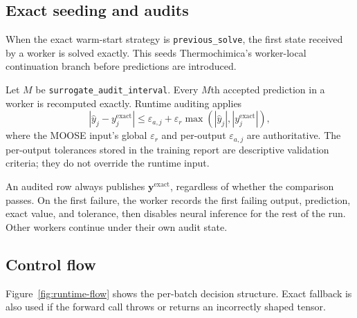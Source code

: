 \documentclass[11pt]{article}
\newcommand{\abs}[1]{\left\lvert #1\right\rvert}
\newcommand{\code}[1]{\texttt{#1}}
\begin{document}
\subsection{Exact seeding and audits}

When the exact warm-start strategy is \code{previous\_solve}, the first state received by a worker
is solved exactly.  This seeds Thermochimica's worker-local continuation branch before predictions
are introduced.

Let \(M\) be \code{surrogate\_audit\_interval}.  Every \(M\)th accepted prediction in a worker is
recomputed exactly.  Runtime auditing applies
\begin{equation}
  \abs{\widehat y_j-y_j^{\mathrm{exact}}}
  \leq
  \varepsilon_{a,j}
  +\varepsilon_r
   \max\left(\abs{\widehat y_j},\abs{y_j^{\mathrm{exact}}}\right),
  \label{eq:audit}
\end{equation}
where the MOOSE input's global \(\varepsilon_r\) and per-output \(\varepsilon_{a,j}\) are
authoritative.  The per-output tolerances stored in the training report are descriptive validation
criteria; they do not override the runtime input.

An audited row always publishes \(\boldsymbol{y}^{\mathrm{exact}}\), regardless of whether the
comparison passes.  On the first failure, the worker records the first failing output, prediction,
exact value, and tolerance, then disables neural inference for the rest of the run.  Other workers
continue under their own audit state.

\subsection{Control flow}

Figure~\ref{fig:runtime-flow} shows the per-batch decision structure.  Exact fallback is also used
if the forward call throws or returns an incorrectly shaped tensor.
\end{document}
